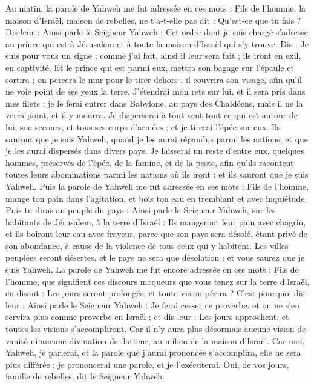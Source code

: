 \begin{multicols}{2}
Au matin, la parole de Yahweh me fut adressée en ces mots :
Fils de l’homme, la maison d'Israël, maison de rebelles, ne t'a-t-elle pas dit : Qu'est-ce que tu fais ?
Dis-leur : Ainsi parle le Seigneur Yahweh : Cet ordre dont je suis chargé s'adresse au prince qui est à Jérusalem et à  toute la maison d'Israël qui s’y trouve.
Dis : Je suis pour vous un signe ; comme j'ai fait, ainsi il leur sera fait ; ils iront en exil, en captivité.
Et le prince qui est parmi eux, mettra son bagage sur l'épaule et sortira ; on percera le mur pour le tirer dehors ; il couvrira son visage, afin qu'il ne voie point de ses yeux la terre\FTNT{}.
J'étendrai mon rets sur lui, et il sera pris dans mes filets ; je le ferai entrer dans Babylone, au pays des Chaldéens, mais il ne la verra point, et il y mourra.
Je disperserai à tout vent tout ce qui est autour de lui, son secours, et tous ses corps d’armées ; et je tirerai l'épée sur eux.
Ils sauront que je suis Yahweh, quand je les aurai répandus parmi les nations, et que je les aurai dispersés dans divers pays.
Je laisserai un reste d'entre eux, quelques hommes, préservés de l'épée, de la famine, et de la peste, afin qu'ils racontent toutes leurs abominations parmi les nations où ils iront ; et ils sauront que je suis Yahweh.
Puis la parole de Yahweh me fut adressée en ces mots :
Fils de l’homme, mange ton pain dans l'agitation, et bois ton eau en tremblant et avec inquiétude.
Puis tu diras au peuple du pays : Ainsi parle le Seigneur Yahweh, sur les habitants de Jérusalem, à la terre d'Israël : Ils mangeront leur pain avec chagrin, et ils boiront leur eau avec frayeur, parce que son pays sera désolé, étant privé de son abondance, à cause de la violence de tous ceux qui y habitent.
Les villes peuplées seront désertes, et le pays ne sera que désolation ; et vous saurez que je suis Yahweh.
La parole de Yahweh me fut encore adressée en ces mots :
Fils de l’homme, que signifient ces discours moqueurs que vous tenez sur la terre d'Israël, en disant : Les jours seront prolongés, et toute vision périra\FTNT{} ?
C'est pourquoi dis-leur : Ainsi parle le Seigneur Yahweh : Je ferai cesser ce proverbe, et on ne s'en servira plus comme proverbe en Israël ; et dis-leur : Les jours approchent, et toutes les visions s’accompliront.
Car il n'y aura plus désormais aucune vision de vanité ni aucune divination de flatteur, au milieu de la maison d'Israël.
Car moi, Yahweh, je parlerai, et la parole que j'aurai prononcée s’accomplira, elle ne sera plus différée ; je prononcerai une parole, et je l'exécuterai. Oui, de vos jours, famille de rebelles, dit le Seigneur Yahweh.

\end{multicols}
